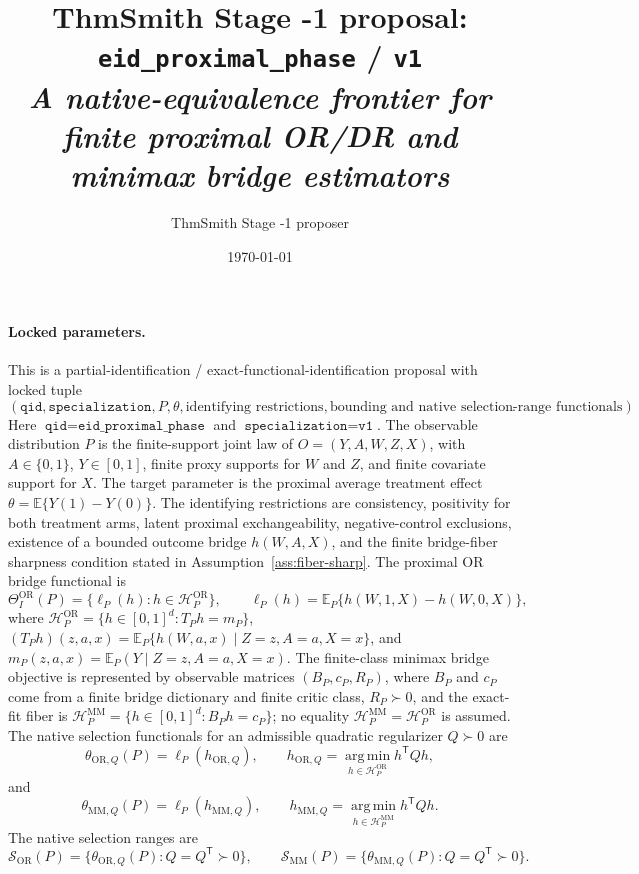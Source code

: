 \documentclass[11pt]{article}
\title{ThmSmith Stage -1 proposal: \texttt{eid\_proximal\_phase} / \texttt{v1}%
  \\ \large\textit{A native-equivalence frontier for finite proximal OR/DR and minimax bridge estimators}}
\author{ThmSmith Stage -1 proposer}
\date{\today}
\newcommand{\E}{\mathbb{E}}
\newcommand{\transpose}{\mathsf{T}}
\newcommand{\calH}{\mathcal{H}}
\theoremstyle{definition}
\theoremstyle{plain}
\theoremstyle{remark}
\begin{document}
\maketitle


\paragraph{Locked parameters.}
This is a partial-identification / exact-functional-identification proposal
with locked tuple
\[
(\texttt{qid},\texttt{specialization}, P, \theta, \text{identifying restrictions},
\text{bounding and native selection-range functionals}).
\]
Here \(\texttt{qid}=\texttt{eid\_proximal\_phase}\) and
\(\texttt{specialization}=\texttt{v1}\).  The observable distribution \(P\)
is the finite-support joint law of \(O=(Y,A,W,Z,X)\), with
\(A\in\{0,1\}\), \(Y\in[0,1]\), finite proxy supports for \(W\) and \(Z\),
and finite covariate support for \(X\).  The target parameter is the proximal
average treatment effect \(\theta=\E\{Y(1)-Y(0)\}\).  The identifying
restrictions are consistency, positivity for both treatment arms, latent
proximal exchangeability, negative-control exclusions, existence of a bounded
outcome bridge \(h(W,A,X)\), and the finite bridge-fiber sharpness condition
stated in Assumption~\ref{ass:fiber-sharp}.  The proximal OR bridge
functional is
\[
\Theta_I^{\mathrm{OR}}(P)=\{\ell_P(h):h\in\calH_P^{\mathrm{OR}}\},\qquad
\ell_P(h)=\E_P\{h(W,1,X)-h(W,0,X)\},
\]
where \(\calH_P^{\mathrm{OR}}=\{h\in[0,1]^d:T_Ph=m_P\}\),
\((T_Ph)(z,a,x)=\E_P\{h(W,a,x)\mid Z=z,A=a,X=x\}\), and
\(m_P(z,a,x)=\E_P(Y\mid Z=z,A=a,X=x)\).  The finite-class minimax bridge
objective is represented by observable matrices \((B_P,c_P,R_P)\), where
\(B_P\) and \(c_P\) come from a finite bridge dictionary and finite critic
class, \(R_P\succ0\), and the exact-fit fiber is
\(\calH_P^{\mathrm{MM}}=\{h\in[0,1]^d:B_Ph=c_P\}\); no equality
\(\calH_P^{\mathrm{MM}}=\calH_P^{\mathrm{OR}}\) is assumed.  The native
selection functionals for an admissible quadratic regularizer \(Q\succ0\)
are
\[
\theta_{\mathrm{OR},Q}(P)=\ell_P(h_{\mathrm{OR},Q}),\qquad
h_{\mathrm{OR},Q}=\operatorname*{arg\,min}_{h\in\calH_P^{\mathrm{OR}}} h^\transpose Qh,
\]
and
\[
\theta_{\mathrm{MM},Q}(P)=\ell_P(h_{\mathrm{MM},Q}),\qquad
h_{\mathrm{MM},Q}=\operatorname*{arg\,min}_{h\in\calH_P^{\mathrm{MM}}} h^\transpose Qh.
\]
The native selection ranges are
\[
\mathcal S_{\mathrm{OR}}(P)=\{\theta_{\mathrm{OR},Q}(P):Q=Q^\transpose\succ0\},
\qquad
\mathcal S_{\mathrm{MM}}(P)=\{\theta_{\mathrm{MM},Q}(P):Q=Q^\transpose\succ0\}.
\]
\end{document}
